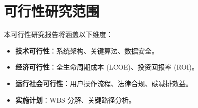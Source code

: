 \section{可行性研究范围}
本可行性研究报告将涵盖以下维度：
\begin{itemize}
    \item \textbf{技术可行性}：系统架构、关键算法、数据安全。
    \item \textbf{经济可行性}：全生命周期成本 (LCOE)、投资回报率 (ROI)。
    \item \textbf{运行社会可行性}：用户操作流程、法律合规、碳减排效益。
    \item \textbf{实施计划}：WBS 分解、关键路径分析。
\end{itemize}
